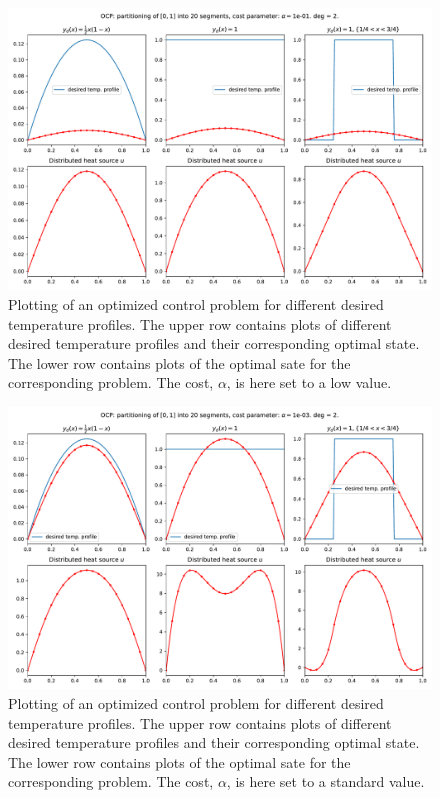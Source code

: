 \begin{figure}[!h]
  \centering
  \includegraphics[width=\textwidth]{Images/plots/task2_fig_0.pdf}
  \caption{Plotting of an optimized control problem for different desired temperature profiles. The upper row contains plots of different desired temperature profiles and their corresponding optimal state.
  The lower row contains plots of the optimal sate for the corresponding problem. The cost, $\alpha$, is here set to a low value.}
  \label{fig:0}
\end{figure}

\begin{figure}[!h]
  \centering
  \includegraphics[width=\textwidth]{Images/plots/task2_fig_1.pdf}
  \caption{Plotting of an optimized control problem for different desired temperature profiles. The upper row contains plots of different desired temperature profiles and their corresponding optimal state.
  The lower row contains plots of the optimal sate for the corresponding problem. The cost, $\alpha$, is here set to a standard value.}
  \label{fig:1}
\end{figure}

